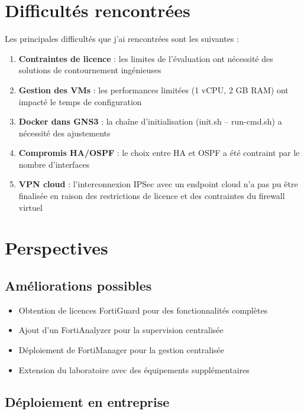 \section{Difficultés rencontrées}

Les principales difficultés que j'ai rencontrées sont les suivantes :

\begin{enumerate}
    \item \textbf{Contraintes de licence} : les limites de l'évaluation ont nécessité des solutions de contournement ingénieuses
    \item \textbf{Gestion des VMs} : les performances limitées (1 vCPU, 2 GB RAM) ont impacté le temps de configuration
    \item \textbf{Docker dans GNS3} : la chaîne d'initialisation (init.sh -- run-cmd.sh) a nécessité des ajustements
    \item \textbf{Compromis HA/OSPF} : le choix entre HA et OSPF a été contraint par le nombre d'interfaces
    \item \textbf{VPN cloud} : l'interconnexion IPSec avec un endpoint cloud n'a pas pu être finalisée en raison des restrictions de licence et des contraintes du firewall virtuel
\end{enumerate}

\section{Perspectives}

\subsection{Améliorations possibles}

\begin{itemize}
    \item Obtention de licences FortiGuard pour des fonctionnalités complètes
    \item Ajout d'un FortiAnalyzer pour la supervision centralisée
    \item Déploiement de FortiManager pour la gestion centralisée
    \item Extension du laboratoire avec des équipements supplémentaires
\end{itemize}

\subsection{Déploiement en entreprise}

